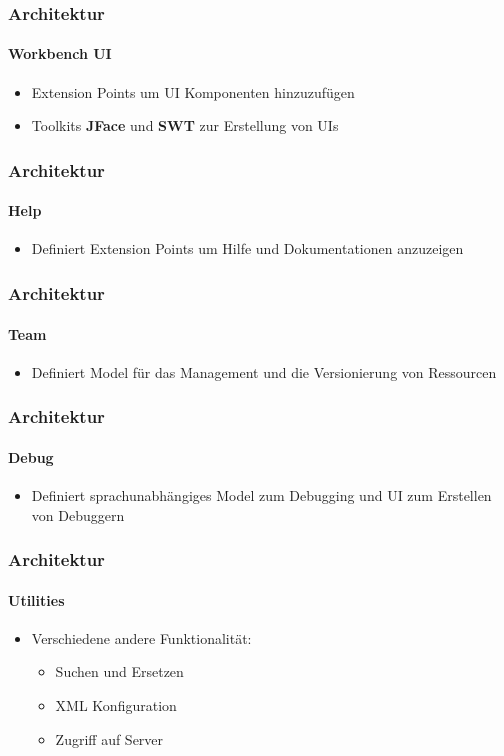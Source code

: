 {\begin{frame}
  \frametitle{Architektur}
  \framesubtitle{Workbench UI}
  \begin{itemize}
    \item Extension Points um UI Komponenten hinzuzufügen
    \item Toolkits \textbf{JFace} und \textbf{SWT} zur Erstellung von UIs
  \end{itemize}
\end{frame}

\begin{frame}
  \frametitle{Architektur}
  \framesubtitle{Help}
  \begin{itemize}
    \item Definiert Extension Points um Hilfe und Dokumentationen anzuzeigen
  \end{itemize}
\end{frame}

\begin{frame}
  \frametitle{Architektur}
  \framesubtitle{Team}
  \begin{itemize}
    \item Definiert Model für das Management und die Versionierung von Ressourcen
  \end{itemize}
\end{frame}

\begin{frame}
  \frametitle{Architektur}
  \framesubtitle{Debug}
  \begin{itemize}
    \item Definiert sprachunabhängiges Model zum Debugging und UI zum Erstellen von Debuggern
  \end{itemize}
\end{frame}

\begin{frame}
  \frametitle{Architektur}
  \framesubtitle{Utilities}
  \begin{itemize}
    \item Verschiedene andere Funktionalität:
    \begin{itemize}
      \item Suchen und Ersetzen
      \item XML Konfiguration
      \item Zugriff auf Server
    \end{itemize}
  \end{itemize}
\end{frame}

}
